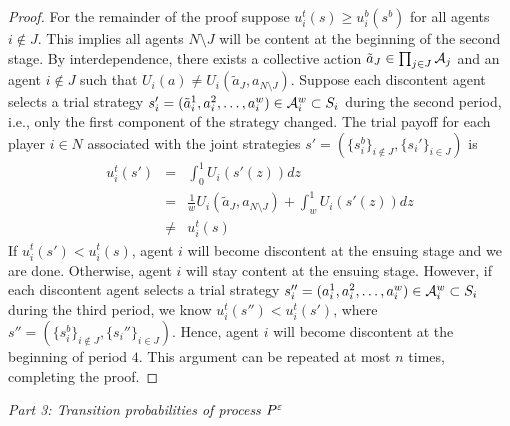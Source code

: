 \begin{proof}
For the remainder of the proof suppose $u_i^t(s) \geq u_i^b(s^b)$ for all agents $i \notin J$. This implies all agents $N \setminus J$ will be content at the beginning of the second stage.  By interdependence, there exists a collective action $\tilde{a}_J \in \prod_{j \in J} {\cal A}_j$ and an agent $i \notin J$ such that $U_i(a) \neq U_i(\tilde{a}_J, a_{N\setminus J})$.   Suppose each discontent agent selects a trial strategy $s_i' = (\tilde{a}_i^1, a_i^2, \dots, a_i^w) \in {\cal A}_i^w \subset S_i$ during the second period, i.e., only the first component of the strategy changed.  The trial payoff for each player $i \in N$ associated with the joint strategies $s' = (\{s_i^b\}_{i \notin J}, \{s_i'\}_{i \in J})$ is 
%
\begin{eqnarray*}
u_i^t(s') &=&  \int_{0}^{1} U_i(s'(z)) dz \\
&=&  \frac{1}{w} U_i(\tilde{a}_J, a_{N\setminus J}) + \int_{w}^{1} U_i(s'(z)) dz \\ 
&\neq&  u_i^t(s)
\end{eqnarray*}
If $u_i^t(s') < u_i^t(s)$, agent $i$ will become discontent at the ensuing stage and we are done.  Otherwise, %
agent $i$ will stay content at the ensuing stage.  However, if each discontent agent selects a trial strategy $s_i'' = (a_i^1, a_i^2, \dots, a_i^w) \in {\cal A}_i^w \subset S_i$ during the third period, we know $u_i^t(s'') < u_i^t(s')$, where $s'' = (\{s_i^b\}_{i \notin J}, \{s_i''\}_{i \in J})$.  Hence, agent $i$ will become discontent at the beginning of period $4$. This argument can be repeated at most $n$ times, completing the proof.  
%
\end{proof}

\vspace{.2cm}
\noindent \emph{Part 3:  Transition probabilities of process $P^\varepsilon$}
\vspace{.2cm}

